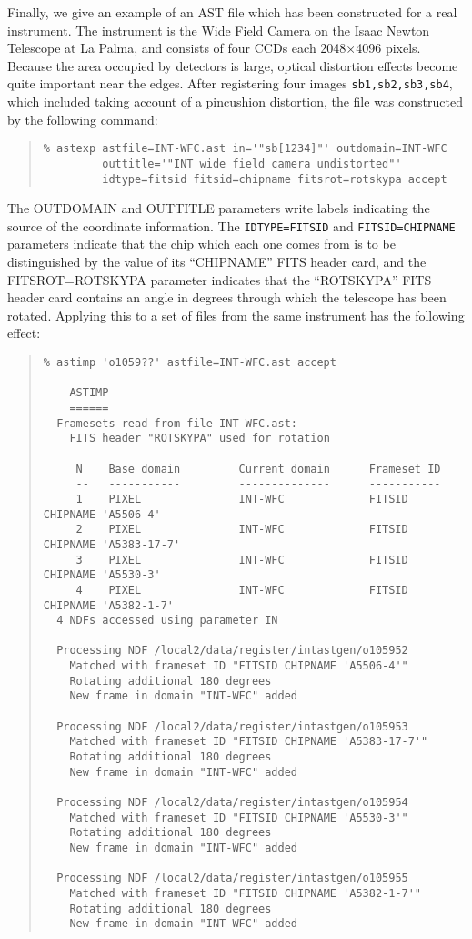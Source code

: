 \documentclass[twoside,11pt]{article}
\renewcommand{\_}{\texttt{\symbol{95}}}
\newenvironment{myquote}{\begin{quote}\begin{small}}{\end{small}\end{quote}}
\begin{document}
Finally, we give an example of an AST file which 
has been constructed for a real 
instrument.  The instrument is the Wide Field Camera on
the Isaac Newton Telescope at La Palma,
and consists of four CCDs each 2048$\times$4096 pixels.
Because the area occupied by detectors is large, 
optical distortion effects become quite important near the edges.
After registering four images {\tt sb1,sb2,sb3,sb4},
which included taking account of a pincushion distortion,
the file was constructed by the following command:
\begin{myquote}
\begin{verbatim}
% astexp astfile=INT-WFC.ast in='"sb[1234]"' outdomain=INT-WFC
         outtitle='"INT wide field camera undistorted"'
         idtype=fitsid fitsid=chipname fitsrot=rotskypa accept
\end{verbatim}
\end{myquote}
The OUTDOMAIN and OUTTITLE parameters write labels indicating 
the source of the coordinate information.
The {\tt IDTYPE=FITSID} and {\tt FITSID=CHIPNAME} parameters 
indicate that the chip which each
one comes from is to be distinguished by the value of its
``CHIPNAME'' FITS header card, and the FITSROT=ROTSKYPA
parameter indicates that the ``ROTSKYPA'' FITS header card
contains an angle in degrees through which the telescope has
been rotated.
Applying this to a set of files from the same instrument has
the following effect:
\begin{myquote}
\begin{verbatim}
% astimp 'o1059??' astfile=INT-WFC.ast accept

    ASTIMP
    ======
  Framesets read from file INT-WFC.ast:
    FITS header "ROTSKYPA" used for rotation

     N    Base domain         Current domain      Frameset ID
     --   -----------         --------------      -----------
     1    PIXEL               INT-WFC             FITSID CHIPNAME 'A5506-4'
     2    PIXEL               INT-WFC             FITSID CHIPNAME 'A5383-17-7'
     3    PIXEL               INT-WFC             FITSID CHIPNAME 'A5530-3'
     4    PIXEL               INT-WFC             FITSID CHIPNAME 'A5382-1-7'
  4 NDFs accessed using parameter IN

  Processing NDF /local2/data/register/intastgen/o105952
    Matched with frameset ID "FITSID CHIPNAME 'A5506-4'"
    Rotating additional 180 degrees
    New frame in domain "INT-WFC" added

  Processing NDF /local2/data/register/intastgen/o105953
    Matched with frameset ID "FITSID CHIPNAME 'A5383-17-7'"
    Rotating additional 180 degrees
    New frame in domain "INT-WFC" added

  Processing NDF /local2/data/register/intastgen/o105954
    Matched with frameset ID "FITSID CHIPNAME 'A5530-3'"
    Rotating additional 180 degrees
    New frame in domain "INT-WFC" added

  Processing NDF /local2/data/register/intastgen/o105955
    Matched with frameset ID "FITSID CHIPNAME 'A5382-1-7'"
    Rotating additional 180 degrees
    New frame in domain "INT-WFC" added
\end{verbatim}
\end{myquote}
\end{document}
